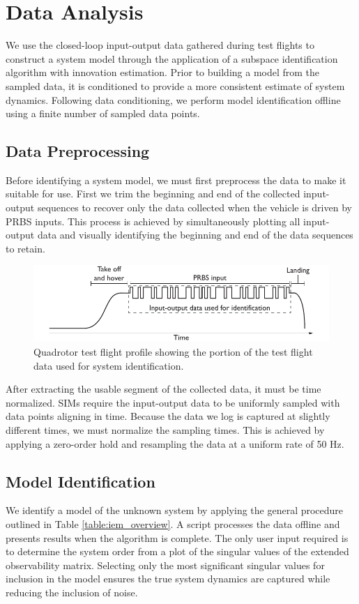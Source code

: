 \section{Data Analysis}
We use the closed-loop input-output data gathered during test flights to construct a system model through the application of a subspace identification algorithm with innovation estimation. Prior to building a model from the sampled data, it is conditioned to provide a more consistent estimate of system dynamics. Following data conditioning, we perform model identification offline using a finite number of sampled data points.


\subsection{Data Preprocessing}
Before identifying a system model, we must first preprocess the data to make it suitable for use. First we trim the beginning and end of the collected input-output sequences to recover only the data collected when the vehicle is driven by PRBS inputs. This process is achieved by simultaneously plotting all input-output data and visually identifying the beginning and end of the data sequences to retain.
\begin{figure}[htb!]
	\centering
	\includegraphics{../fig/test_flight_profile.pdf}
	\caption{Quadrotor test flight profile showing the portion of the test flight data used for system identification.}
	\label{fig:test_flight_profile}
\end{figure}

After extracting the usable segment of the collected data, it must be time normalized. SIMs require the input-output data to be uniformly sampled with data points aligning in time. Because the data we log is captured at slightly different times, we must normalize the sampling times. This is achieved by applying a zero-order hold and resampling the data at a uniform rate of 50 Hz.


\subsection{Model Identification}
We identify a model of the unknown system by applying the general procedure outlined in Table \ref{table:iem_overview}. A \matlab script processes the data offline and presents results when the algorithm is complete. The only user input required is to determine the system order from a plot of the singular values of the extended observability matrix. Selecting only the most significant singular values for inclusion in the model ensures the true system dynamics are captured while reducing the inclusion of noise.

